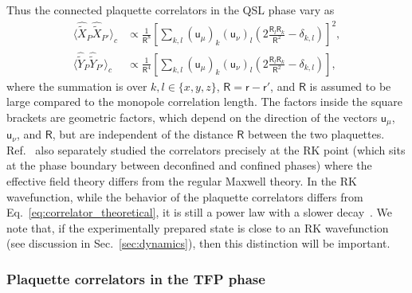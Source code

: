 \documentclass[twocolumn,superscriptaddress,amsmath,amssymb,aps,prx,nofootinbib]{revtex4-2}
\newcommand{\dual}[1]{\boldsymbol{\mathsf{#1}}}
\begin{document}
Thus the connected plaquette correlators in the QSL phase vary as
\begin{equation}\label{eq:correlator_theoretical}
  \begin{aligned}
    \langle \hat{\tilde{X}}_P \hat{\tilde{X}}_{P'} \rangle_c & \propto \frac{1}{\mathsf{R}^8} \left[ \sum_{k,l  } ( \dual{u}_\mu )_k ( \dual{u}_\nu )_l  \left(  2 \frac{\mathsf{R}_l \mathsf{R}_k}{\mathsf{R}^2} -  \delta_{k,l} \right) \right]^2 ,\\
    \langle \hat{\tilde{Y}}_P \hat{\tilde{Y}}_{P'} \rangle_c &  \propto \frac{1}{\mathsf{R}^4} \left[ \sum_{k,l  } ( \dual{u}_\mu )_k ( \dual{u}_\nu )_l  \left(  2 \frac{\mathsf{R}_l \mathsf{R}_k}{\mathsf{R}^2} -  \delta_{k,l} \right) \right],
\end{aligned}
\end{equation}
where the summation is over $k,l \in \{ x,y,z \}$, $\dual{R} = \dual{r} - \dual{r}'$, and $\mathsf{R}$ is assumed to be large compared to the monopole correlation length. The factors inside the square brackets are geometric factors, which depend on the direction of the vectors $\dual{u}_\mu$, $\dual{u}_\nu$, and $\dual{R}$, but are  independent of the distance $\mathsf{R}$ between the two plaquettes. Ref.~\cite{hermele2004} also separately studied the correlators precisely at the RK point (which sits at the phase boundary between deconfined and confined phases) where the effective field theory differs from the regular Maxwell theory. In the RK wavefunction, while the behavior of the plaquette correlators differs from Eq.~\eqref{eq:correlator_theoretical}, it is still a power law with a slower decay~\cite{hermele2004}. We note that, if the experimentally prepared state is close to an RK wavefunction (see discussion in Sec.~\ref{sec:dynamics}), then this distinction will be important.


\subsubsection{Plaquette correlators in the TFP phase}
\end{document}
